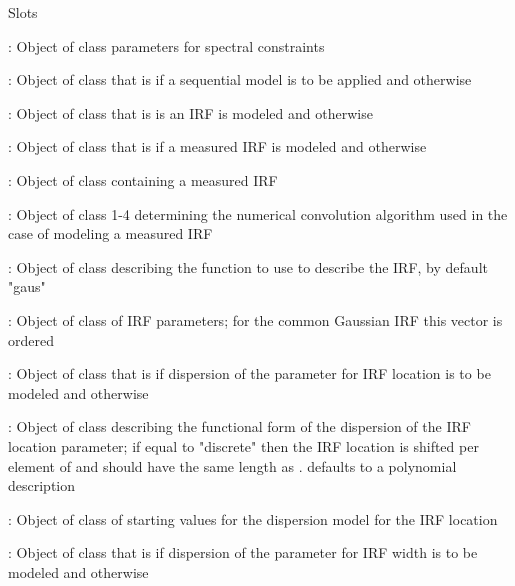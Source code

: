 \begin{Section}{Slots}
\item[\code{specpar}:] Object of class   parameters for
spectral constraints
\item[\code{seqmod}:] Object of class   that is  if a sequential model is to be applied
and  otherwise
\item[\code{irf}:] Object of class    that is  is an IRF is modeled and  otherwise
\item[\code{mirf}:] Object of class   that is  if a measured IRF is modeled and 
otherwise
\item[\code{measured\_irf}:] Object of class   containing a measured IRF
\item[\code{convalg}:] Object of class   1-4 determining the numerical convolution algorithm 
used in the case of modeling a measured IRF
\item[\code{irffun}:] Object of class   describing the 
function to use to describe the IRF, by default "gaus"
\item[\code{irfpar}:] Object of class   of IRF parameters; for the common Gaussian IRF this 
vector is ordered 
\item[\code{dispmu}:] Object of class    that is  if dispersion of the parameter for IRF 
location is to be modeled and  otherwise
\item[\code{dispmufun}:] Object of class   describing the functional form of the 
dispersion of the IRF location parameter; if equal to "discrete" then the 
IRF location is shifted per element of  and  should have the same 
length as .  defaults to a polynomial description
\item[\code{parmu}:] Object of class    of starting values for the dispersion model for the 
IRF location
\item[\code{disptau}:] Object of class   that is  if dispersion of the parameter for 
IRF width is to be modeled and  otherwise

\end{Section}
